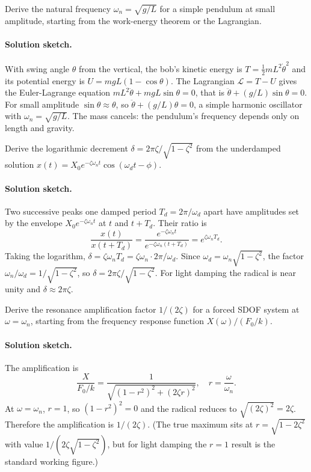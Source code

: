 \begin{exercise}
Derive the natural frequency $\omega_n = \sqrt{g/L}$ for a simple
pendulum at small amplitude, starting from the work-energy theorem
or the Lagrangian.

\paragraph{Solution sketch.} With swing angle $\theta$ from the
vertical, the bob's kinetic energy is $T = \tfrac{1}{2}mL^2\dot
\theta^2$ and its potential energy is $U = mgL(1 - \cos\theta)$. The
Lagrangian $\mathcal{L} = T - U$ gives the Euler-Lagrange equation
$mL^2\ddot\theta + mgL\sin\theta = 0$, that is $\ddot\theta +
(g/L)\sin\theta = 0$. For small amplitude $\sin\theta \approx \theta$,
so $\ddot\theta + (g/L)\theta = 0$, a simple harmonic oscillator with
$\omega_n = \sqrt{g/L}$. The mass cancels: the pendulum's frequency
depends only on length and gravity.
\end{exercise}

\begin{exercise}
Derive the logarithmic decrement $\delta = 2\pi\zeta/\sqrt{1-\zeta^2}$
from the underdamped solution $x(t) = X_0 e^{-\zeta\omega_n t}\cos(
\omega_d t - \phi)$.

\paragraph{Solution sketch.} Two successive peaks one damped period
$T_d = 2\pi/\omega_d$ apart have amplitudes set by the envelope
$X_0 e^{-\zeta\omega_n t}$ at $t$ and $t + T_d$. Their ratio is
\[
\frac{x(t)}{x(t + T_d)} = \frac{e^{-\zeta\omega_n t}}{e^{-\zeta
\omega_n (t + T_d)}} = e^{\zeta\omega_n T_d}.
\]
Taking the logarithm, $\delta = \zeta\omega_n T_d = \zeta\omega_n
\cdot 2\pi/\omega_d$. Since $\omega_d = \omega_n\sqrt{1 - \zeta^2}$,
the factor $\omega_n/\omega_d = 1/\sqrt{1 - \zeta^2}$, so $\delta =
2\pi\zeta/\sqrt{1 - \zeta^2}$. For light damping the radical is near
unity and $\delta \approx 2\pi\zeta$.
\end{exercise}

\begin{exercise}
Derive the resonance amplification factor $1/(2\zeta)$ for a
forced SDOF system at $\omega = \omega_n$, starting from the
frequency response function $X(\omega)/(F_0/k)$.

\paragraph{Solution sketch.} The amplification is
\[
\frac{X}{F_0/k} = \frac{1}{\sqrt{(1 - r^2)^2 + (2\zeta r)^2}}, \quad
r = \frac{\omega}{\omega_n}.
\]
At $\omega = \omega_n$, $r = 1$, so $(1 - r^2)^2 = 0$ and the radical
reduces to $\sqrt{(2\zeta)^2} = 2\zeta$. Therefore the amplification
is $1/(2\zeta)$. (The true maximum sits at $r = \sqrt{1 - 2\zeta^2}$
with value $1/(2\zeta\sqrt{1-\zeta^2})$, but for light damping the
$r = 1$ result is the standard working figure.)
\end{exercise}

